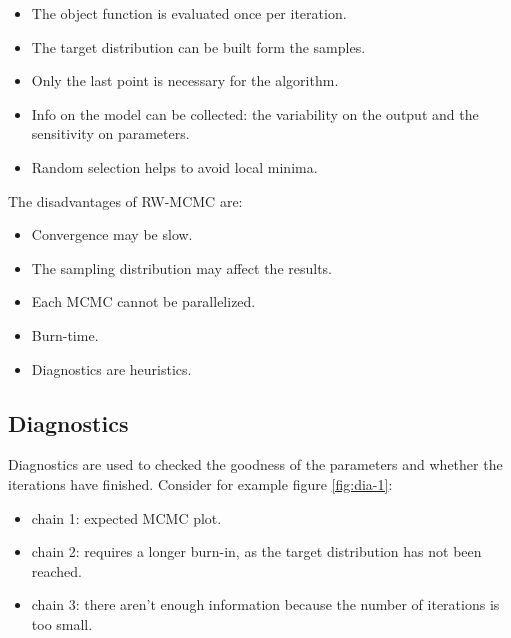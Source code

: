   \begin{multicols}{2}
    \begin{itemize}
      \item The object function is evaluated once per iteration.
      \item The target distribution can be built form the samples.
      \item Only the last point is necessary for the algorithm.
      \item Info on the model can be collected: the variability on the output and the sensitivity on parameters.
      \item Random selection helps to avoid local minima.
    \end{itemize}
  \end{multicols}

  The disadvantages of RW-MCMC are:

  \begin{multicols}{2}
    \begin{itemize}
      \item Convergence may be slow.
      \item The sampling distribution may affect the results.
      \item Each MCMC cannot be parallelized.
      \item Burn-time.
      \item Diagnostics are heuristics.
    \end{itemize}
  \end{multicols}

  \subsection{Diagnostics}
  Diagnostics are used to checked the goodness of the parameters and whether the iterations have finished.
  Consider for example figure \ref{fig:dia-1}:

  \begin{multicols}{2}
    \begin{itemize}
      \item chain 1: expected MCMC plot.
      \item chain 2: requires a longer burn-in, as the target distribution has not been reached.
      \item chain 3: there aren't enough information because the number of iterations is too small.
    \end{itemize}
  \end{multicols}

